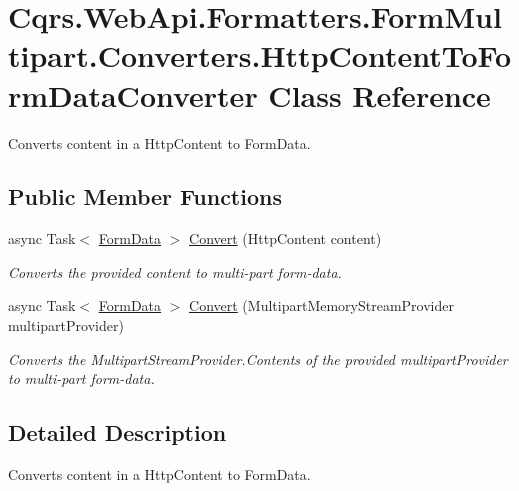 \hypertarget{classCqrs_1_1WebApi_1_1Formatters_1_1FormMultipart_1_1Converters_1_1HttpContentToFormDataConverter}{}\section{Cqrs.\+Web\+Api.\+Formatters.\+Form\+Multipart.\+Converters.\+Http\+Content\+To\+Form\+Data\+Converter Class Reference}
\label{classCqrs_1_1WebApi_1_1Formatters_1_1FormMultipart_1_1Converters_1_1HttpContentToFormDataConverter}


Converts content in a Http\+Content to Form\+Data.  


\subsection*{Public Member Functions}
\begin{DoxyCompactItemize}
\item 
async Task$<$ \hyperlink{classCqrs_1_1WebApi_1_1Formatters_1_1FormMultipart_1_1Infrastructure_1_1FormData}{Form\+Data} $>$ \hyperlink{classCqrs_1_1WebApi_1_1Formatters_1_1FormMultipart_1_1Converters_1_1HttpContentToFormDataConverter_aea4d3dbab4e6f6892a6181a0911d4652_aea4d3dbab4e6f6892a6181a0911d4652}{Convert} (Http\+Content content)
\begin{DoxyCompactList}\small\item\em Converts the provided {\itshape content}  to multi-\/part form-\/data. \end{DoxyCompactList}\item 
async Task$<$ \hyperlink{classCqrs_1_1WebApi_1_1Formatters_1_1FormMultipart_1_1Infrastructure_1_1FormData}{Form\+Data} $>$ \hyperlink{classCqrs_1_1WebApi_1_1Formatters_1_1FormMultipart_1_1Converters_1_1HttpContentToFormDataConverter_ae6f522873d47a96df7b4616c7e2d6290_ae6f522873d47a96df7b4616c7e2d6290}{Convert} (Multipart\+Memory\+Stream\+Provider multipart\+Provider)
\begin{DoxyCompactList}\small\item\em Converts the Multipart\+Stream\+Provider.\+Contents of the provided {\itshape multipart\+Provider}  to multi-\/part form-\/data. \end{DoxyCompactList}\end{DoxyCompactItemize}


\subsection{Detailed Description}
Converts content in a Http\+Content to Form\+Data. 



